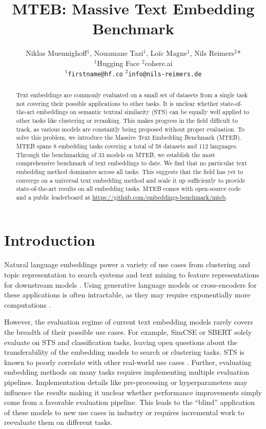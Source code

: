 \documentclass[11pt]{article}
\title{MTEB: Massive Text Embedding Benchmark}
\author{Niklas Muennighoff$^1$, Nouamane Tazi$^1$, Loïc Magne$^1$, Nils Reimers$^2$* \\
  $^1$Hugging Face \quad $^2$cohere.ai \\
  $^1${\tt firstname@hf.co} \quad $^2${\tt info@nils-reimers.de}\\
}
\begin{document}
\maketitle
\begingroup\def\thefootnote{*}\endgroup
\begin{abstract}

Text embeddings are commonly evaluated on a small set of datasets from a single task not covering their possible applications to other tasks. It is unclear whether state-of-the-art embeddings on semantic textual similarity (STS) can be equally well applied to other tasks like clustering or reranking. This makes progress in the field difficult to track, as various models are constantly being proposed without proper evaluation. To solve this problem, we introduce the Massive Text Embedding Benchmark (MTEB). MTEB spans 8 embedding tasks covering a total of 58 datasets and 112 languages. Through the benchmarking of 33 models on MTEB, we establish the most comprehensive benchmark of text embeddings to date. We find that no particular text embedding method dominates across all tasks. This suggests that the field has yet to converge on a universal text embedding method and scale it up sufficiently to provide state-of-the-art results on all embedding tasks. MTEB comes with open-source code and a public leaderboard at
\url{https://github.com/embeddings-benchmark/mteb}.

\end{abstract}

\section{Introduction}

Natural language embeddings power a variety of use cases from clustering and topic representation \cite{aggarwal2012survey, angelov2020top2vec} to search systems and text mining \cite{huang2020embedding, zhu2021bing, nayak2021google} to feature representations for downstream models \cite{saharia2022photorealistic, borgeaud2022improving}. Using generative language models or cross-encoders for these applications is often intractable, as they may require exponentially more computations \cite{reimers2019sentence}.

However, the evaluation regime of current text embedding models rarely covers the breadth of their possible use cases. For example, SimCSE \cite{gao2021simcse} or SBERT \cite{reimers2019sentence} solely evaluate on STS and classification tasks, leaving open questions about the transferability of the embedding models to search or clustering tasks. STS is known to poorly correlate with other real-world use cases \cite{neelakantan2022text, wang2021tsdae}. Further, evaluating embedding methods on many tasks requires implementing multiple evaluation pipelines. Implementation details like pre-processing or hyperparameters may influence the results making it unclear whether performance improvements simply come from a favorable evaluation pipeline. This leads to the ``blind'' application of these models to new use cases in industry or requires incremental work to reevaluate them on different tasks.
\end{document}
